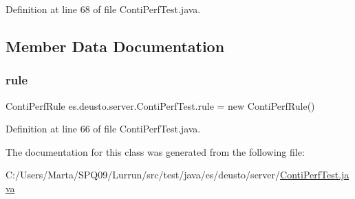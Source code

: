 Definition at line 68 of file Conti\+Perf\+Test.\+java.



\subsection{Member Data Documentation}
\mbox{\label{classes_1_1deusto_1_1server_1_1_conti_perf_test_a36643de9d25126a2f4d24e6b61987c31}} 
\subsubsection{\texorpdfstring{rule}{rule}}
{\footnotesize\ttfamily Conti\+Perf\+Rule es.\+deusto.\+server.\+Conti\+Perf\+Test.\+rule = new Conti\+Perf\+Rule()}



Definition at line 66 of file Conti\+Perf\+Test.\+java.



The documentation for this class was generated from the following file\+:\begin{DoxyCompactItemize}
\item 
C\+:/\+Users/\+Marta/\+S\+P\+Q09/\+Lurrun/src/test/java/es/deusto/server/\hyperlink{_conti_perf_test_8java}{Conti\+Perf\+Test.\+java}\end{DoxyCompactItemize}
